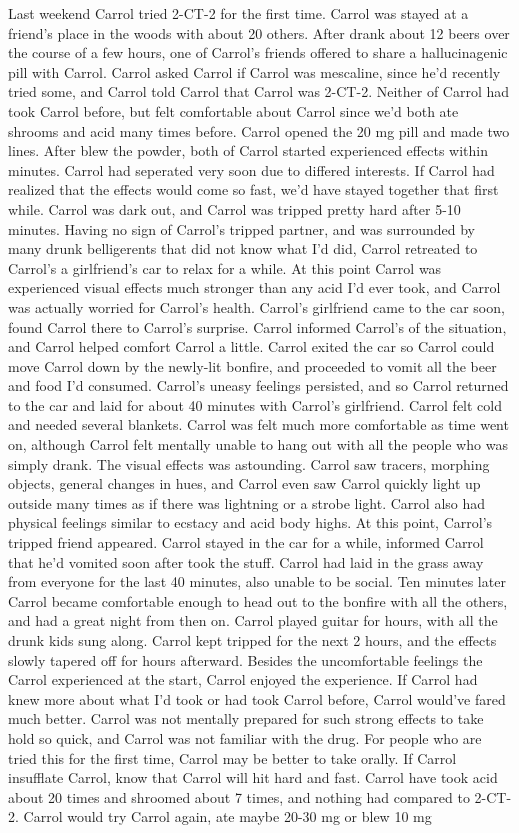 \documentclass[12pt]{book}
\begin{document}
Last weekend Carrol tried 2-CT-2 for the first time. Carrol was stayed at a friend's place in the woods with about 20 others. After drank about 12 beers over the course of a few hours, one of Carrol's friends offered to share a hallucinagenic pill with Carrol. Carrol asked Carrol if Carrol was mescaline, since he'd recently tried some, and Carrol told Carrol that Carrol was 2-CT-2. Neither of Carrol had took Carrol before, but felt comfortable about Carrol since we'd both ate shrooms and acid many times before. Carrol opened the 20 mg pill and made two lines. After blew the powder, both of Carrol started experienced effects within minutes. Carrol had seperated very soon due to differed interests. If Carrol had realized that the effects would come so fast, we'd have stayed together that first while. Carrol was dark out, and Carrol was tripped pretty hard after 5-10 minutes. Having no sign of Carrol's tripped partner, and was surrounded by many drunk belligerents that did not know what I'd did, Carrol retreated to Carrol's a girlfriend's car to relax for a while. At this point Carrol was experienced visual effects much stronger than any acid I'd ever took, and Carrol was actually worried for Carrol's health. Carrol's girlfriend came to the car soon, found Carrol there to Carrol's surprise. Carrol informed Carrol's of the situation, and Carrol helped comfort Carrol a little. Carrol exited the car so Carrol could move Carrol down by the newly-lit bonfire, and proceeded to vomit all the beer and food I'd consumed. Carrol's uneasy feelings persisted, and so Carrol returned to the car and laid for about 40 minutes with Carrol's girlfriend. Carrol felt cold and needed several blankets. Carrol was felt much more comfortable as time went on, although Carrol felt mentally unable to hang out with all the people who was simply drank. The visual effects was astounding. Carrol saw tracers, morphing objects, general changes in hues, and Carrol even saw Carrol quickly light up outside many times as if there was lightning or a strobe light. Carrol also had physical feelings similar to ecstacy and acid body highs. At this point, Carrol's tripped friend appeared. Carrol stayed in the car for a while, informed Carrol that he'd vomited soon after took the stuff. Carrol had laid in the grass away from everyone for the last 40 minutes, also unable to be social. Ten minutes later Carrol became comfortable enough to head out to the bonfire with all the others, and had a great night from then on. Carrol played guitar for hours, with all the drunk kids sung along. Carrol kept tripped for the next 2 hours, and the effects slowly tapered off for hours afterward. Besides the uncomfortable feelings the Carrol experienced at the start, Carrol enjoyed the experience. If Carrol had knew more about what I'd took or had took Carrol before, Carrol would've fared much better. Carrol was not mentally prepared for such strong effects to take hold so quick, and Carrol was not familiar with the drug. For people who are tried this for the first time, Carrol may be better to take orally. If Carrol insufflate Carrol, know that Carrol will hit hard and fast. Carrol have took acid about 20 times and shroomed about 7 times, and nothing had compared to 2-CT-2. Carrol would try Carrol again, ate maybe 20-30 mg or blew 10 mg 
\end{document}
